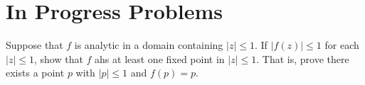 \setchapterpreamble[u]{\margintoc}
\chapter{In Progress Problems}

\begin{qualproblem}[Spring 2020.C5]
    Suppose that $f$ is analytic in a domain containing $|z|\leq 1$. If $|f(z)|\leq 1$ for each $|z|\leq 1$, show that $f$ ahs at least one fixed point in $|z|\leq 1$. That is, prove there exists a point $p$ with $|p|\leq1$ and $f(p) = p$.


\end{qualproblem}



